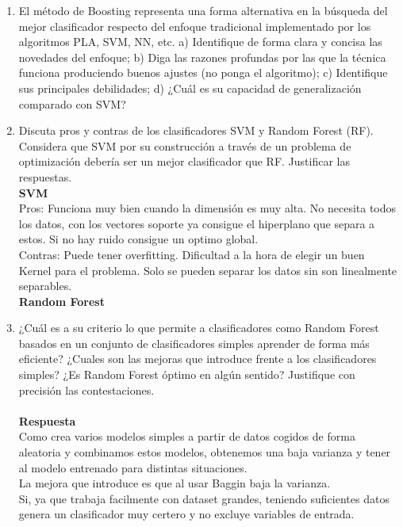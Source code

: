 \documentclass[12pt,a4paper]{article}
\begin{document}
\begin{enumerate}
		\item El método de Boosting representa una forma alternativa en la búsqueda del mejor clasificador
respecto del enfoque tradicional implementado por los algoritmos PLA, SVM, NN, etc. a) Identifique de forma clara y concisa las novedades del enfoque; b) Diga las razones profundas
por las que la técnica funciona produciendo buenos ajustes (no ponga el algoritmo); c) Identifique sus principales debilidades; d) ¿Cuál es su capacidad de generalización comparado
		con SVM?
		
		\item Discuta pros y contras de los clasificadores SVM y Random Forest (RF). Considera que
		SVM por su construcción a través de un problema de optimización debería ser un mejor
		clasificador que RF. Justificar las respuestas.\\
		 
		\textbf{SVM}
		\\Pros: Funciona muy bien cuando la dimensión es muy alta. No necesita todos los datos, con los vectores soporte ya consigue el hiperplano que separa a estos. Si no hay ruido consigue un optimo global. 
		\\Contras: Puede tener overfitting. Dificultad a la hora de elegir un buen Kernel para el problema. Solo se pueden separar los datos sin son linealmente separables.
		\\
		\textbf{Random Forest}
		\\
		 
		\item ¿Cuál es a su criterio lo que permite a clasificadores como Random Forest basados en
		un conjunto de clasificadores simples aprender de forma más eficiente? ¿Cuales son las
		mejoras que introduce frente a los clasificadores simples? ¿Es Random Forest óptimo en
		algún sentido? Justifique con precisión las contestaciones. \\\\
		\textbf{Respuesta}\\
		Como crea varios modelos simples a partir de datos cogidos de forma aleatoria y combinamos  estos modelos, obtenemos una baja varianza y tener al modelo entrenado para distintas situaciones.\\
		La mejora que introduce es que al usar Baggin baja la varianza. \\
		Si, ya que trabaja facilmente con dataset grandes, teniendo suficientes datos genera un clasificador muy certero y no excluye variables de entrada.
		

\end{enumerate}
\end{document}
